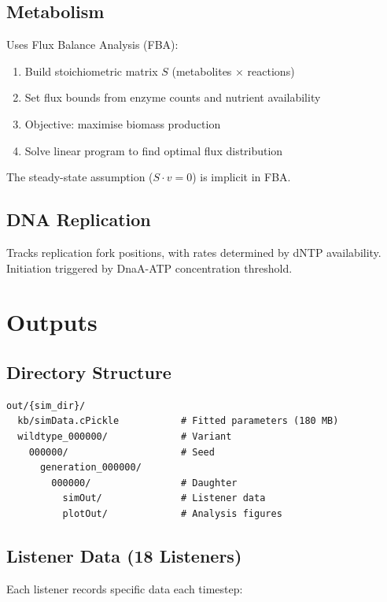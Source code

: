 \documentclass[11pt,a4paper]{report}
\begin{document}
\subsection{Metabolism}

Uses Flux Balance Analysis (FBA):

\begin{enumerate}
    \item Build stoichiometric matrix $S$ (metabolites $\times$ reactions)
    \item Set flux bounds from enzyme counts and nutrient availability
    \item Objective: maximise biomass production
    \item Solve linear program to find optimal flux distribution
\end{enumerate}

The steady-state assumption ($S \cdot v = 0$) is implicit in FBA.

\subsection{DNA Replication}

Tracks replication fork positions, with rates determined by dNTP availability. Initiation triggered by DnaA-ATP concentration threshold.

\section{Outputs}

\subsection{Directory Structure}

\begin{lstlisting}
out/{sim_dir}/
  kb/simData.cPickle           # Fitted parameters (180 MB)
  wildtype_000000/             # Variant
    000000/                    # Seed
      generation_000000/
        000000/                # Daughter
          simOut/              # Listener data
          plotOut/             # Analysis figures
\end{lstlisting}

\subsection{Listener Data (18 Listeners)}

Each listener records specific data each timestep:
\end{document}
